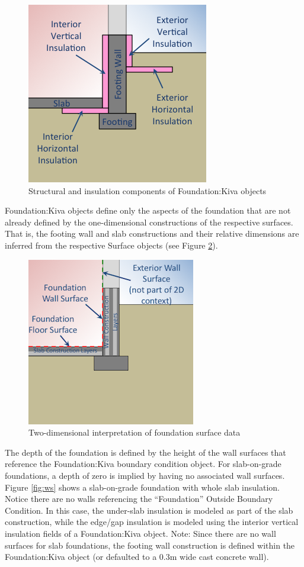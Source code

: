 \begin{figure}
\centering
\includegraphics{media/kiva-2d-elements.png}
\caption{Structural and insulation components of Foundation:Kiva
objects\label{fig:el}}
\end{figure}

Foundation:Kiva objects define only the aspects of the foundation that
are not already defined by the one-dimensional constructions of the
respective surfaces. That is, the footing wall and slab constructions
and their relative dimensions are inferred from the respective Surface
objects (see Figure \ref{fig:surf}).

\begin{figure}
\centering
\includegraphics{media/kiva-2d-surfaces.png}
\caption{Two-dimensional interpretation of foundation surface
data\label{fig:surf}}
\end{figure}

The depth of the foundation is defined by the height of the wall surfaces
that reference the Foundation:Kiva boundary condition object. For
slab-on-grade foundations, a depth of zero is implied by having no
associated wall surfaces. Figure \ref{fig:ws} shows a slab-on-grade
foundation with whole slab insulation. Notice there are no walls
referencing the ``Foundation'' Outside Boundary Condition. In this case,
the under-slab insulation is modeled as part of the slab construction,
while the edge/gap insulation is modeled using the interior vertical
insulation fields of a Foundation:Kiva object. Note: Since there are no
wall surfaces for slab foundations, the footing wall construction is
defined within the Foundation:Kiva object (or defaulted to a 0.3m wide
cast concrete wall).

